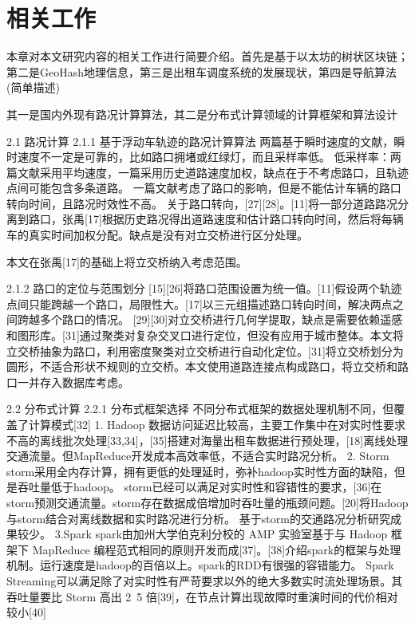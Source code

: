 \chapter{相关工作}
本章对本文研究内容的相关工作进行简要介绍。首先是基于以太坊的树状区块链；第二是GeoHash地理信息，第三是出租车调度系统的发展现状，第四是导航算法(简单描述)

其一是国内外现有路况计算算法，其二是分布式计算领域的计算框架和算法设计

2.1 路况计算
2.1.1 基于浮动车轨迹的路况计算算法
两篇基于瞬时速度的文献，瞬时速度不一定是可靠的，比如路口拥堵或红绿灯，而且采样率低。
低采样率：两篇文献采用平均速度，一篇采用历史道路速度加权，缺点在于不考虑路口，且轨迹点间可能包含多条道路。
一篇文献考虑了路口的影响，但是不能估计车辆的路口转向时间，且路况时效性不高。
关于路口转向，[27][28]。[11]将一部分道路路况分离到路口，张禹[17]根据历史路况得出道路速度和估计路口转向时间，然后将每辆车的真实时间加权分配。缺点是没有对立交桥进行区分处理。

本文在张禹[17]的基础上将立交桥纳入考虑范围。

2.1.2 路口的定位与范围划分
[15][26]将路口范围设置为统一值。[11]假设两个轨迹点间只能跨越一个路口，局限性大。[17]以三元组描述路口转向时间，解决两点之间跨越多个路口的情况。
[29][30]对立交桥进行几何学提取，缺点是需要依赖遥感和图形库。[31]通过聚类对复杂交叉口进行定位，但没有应用于城市整体。本文将立交桥抽象为路口，利用密度聚类对立交桥进行自动化定位。[31]将立交桥划分为圆形，不适合形状不规则的立交桥。本文使用道路连接点构成路口，将立交桥和路口一并存入数据库考虑。

2.2 分布式计算
2.2.1 分布式框架选择
不同分布式框架的数据处理机制不同，但覆盖了计算模式[32]
1. Hadoop
数据访问延迟比较高，主要工作集中在对实时性要求不高的离线批次处理[33,34]，[35]搭建对海量出租车数据进行预处理，[18]离线处理交通流量。但MapReduce开发成本高效率低，不适合实时路况分析。
2. Storm
storm采用全内存计算，拥有更低的处理延时，弥补hadoop实时性方面的缺陷，但是吞吐量低于hadoop。
storm已经可以满足对实时性和容错性的要求，[36]在storm预测交通流量。storm存在数据成倍增加时吞吐量的瓶颈问题。[20]将Hadoop与storm结合对离线数据和实时路况进行分析。
基于storm的交通路况分析研究成果较少。
3.Spark
spark由加州大学伯克利分校的 AMP 实验室基于与 Hadoop 框架下 MapReduce 编程范式相同的原则开发而成[37]。[38]介绍spark的框架与处理机制。运行速度是hadoop的百倍以上。spark的RDD有很强的容错能力。
Spark Streaming可以满足除了对实时性有严苛要求以外的绝大多数实时流处理场景。其吞吐量要比 Storm 高出 2~5 倍[39]，在节点计算出现故障时重演时间的代价相对较小[40]


